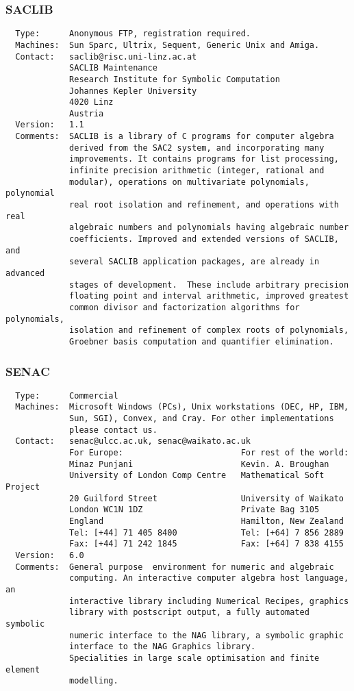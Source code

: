\documentclass[twoside,11pt]{article}
\begin{document}
\subsubsection{SACLIB}
\begin{verbatim}
  Type:      Anonymous FTP, registration required.
  Machines:  Sun Sparc, Ultrix, Sequent, Generic Unix and Amiga.
  Contact:   saclib@risc.uni-linz.ac.at
             SACLIB Maintenance
             Research Institute for Symbolic Computation
             Johannes Kepler University
             4020 Linz
             Austria
  Version:   1.1
  Comments:  SACLIB is a library of C programs for computer algebra
             derived from the SAC2 system, and incorporating many
             improvements. It contains programs for list processing,
             infinite precision arithmetic (integer, rational and
             modular), operations on multivariate polynomials, polynomial
             real root isolation and refinement, and operations with real
             algebraic numbers and polynomials having algebraic number
             coefficients. Improved and extended versions of SACLIB, and
             several SACLIB application packages, are already in advanced
             stages of development.  These include arbitrary precision
             floating point and interval arithmetic, improved greatest
             common divisor and factorization algorithms for polynomials,
             isolation and refinement of complex roots of polynomials,
             Groebner basis computation and quantifier elimination.
\end{verbatim}

\subsubsection{SENAC}
\begin{verbatim}
  Type:      Commercial
  Machines:  Microsoft Windows (PCs), Unix workstations (DEC, HP, IBM,
             Sun, SGI), Convex, and Cray. For other implementations
             please contact us.
  Contact:   senac@ulcc.ac.uk, senac@waikato.ac.uk
             For Europe:                        For rest of the world:
             Minaz Punjani                      Kevin. A. Broughan
             University of London Comp Centre   Mathematical Soft Project
             20 Guilford Street                 University of Waikato
             London WC1N 1DZ                    Private Bag 3105
             England                            Hamilton, New Zealand
             Tel: [+44] 71 405 8400             Tel: [+64] 7 856 2889
             Fax: [+44] 71 242 1845             Fax: [+64] 7 838 4155
  Version:   6.0
  Comments:  General purpose  environment for numeric and algebraic
             computing. An interactive computer algebra host language, an
             interactive library including Numerical Recipes, graphics
             library with postscript output, a fully automated symbolic
             numeric interface to the NAG library, a symbolic graphic
             interface to the NAG Graphics library.
             Specialities in large scale optimisation and finite element
             modelling.
\end{verbatim}
\end{document}

